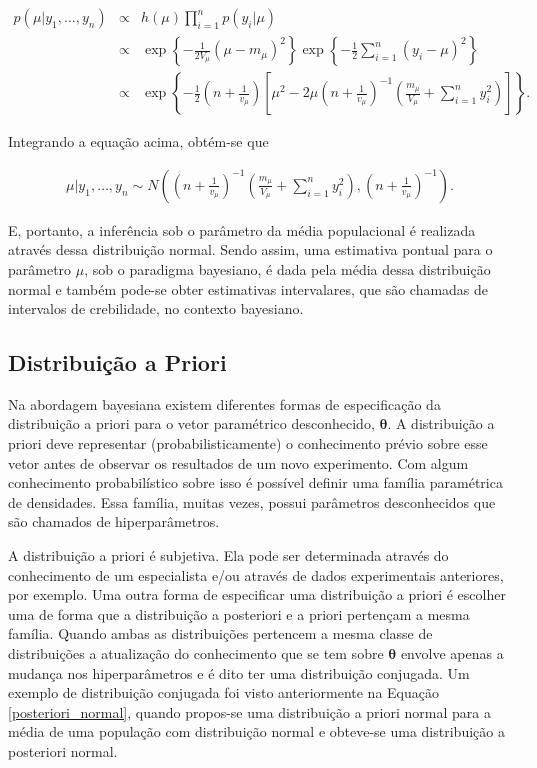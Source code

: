 \documentclass[12pt,a4paper,header]{abnt}
\def\bs{\boldsymbol}
\begin{document}
\begin{eqnarray}
	p(\mu|y_1, \ldots, y_n) &\propto& h(\mu)\prod_{i=1}^n{p(y_i|\mu)}\nonumber \\
	&\propto& \exp\left\{-\frac{1}{2V_\mu}\left(\mu - m_\mu\right)^2\right\} \exp\left\{-\frac{1}{2}\sum_{i=1}^n\left(y_i - \mu\right)^2\right\}\nonumber \\
	&\propto& \exp\left\{-\frac{1}{2} \left( n + \frac{1}{v_\mu} \right) \left[\mu^2 - 2\mu \left( n + \frac{1}{v_\mu} \right)^{-1} \left( \frac{m_\mu}{V_\mu} + \sum_{i=1}^n{y_i^2}\right)\right]   \right\}.
\end{eqnarray}

Integrando a equação acima, obtém-se que

\begin{eqnarray}
\mu|y_1, \ldots, y_n \sim N\left( \left( n + \frac{1}{v_\mu} \right)^{-1} \left( \frac{m_\mu}{V_\mu} + \sum_{i=1}^n{y_i^2}\right), \left( n + \frac{1}{v_\mu} \right)^{-1} \right).\label{posteriori_normal}
\end{eqnarray}


E, portanto, a inferência sob o parâmetro da média populacional é realizada através dessa distribuição normal. Sendo assim, uma estimativa pontual para o parâmetro $\mu$, sob o paradigma bayesiano, é dada pela média dessa distribuição normal e também pode-se obter estimativas intervalares, que são chamadas de intervalos de crebilidade, no contexto bayesiano.

\subsection{Distribuição a Priori}

Na abordagem bayesiana existem diferentes formas de especificação da distribuição a priori para o vetor paramétrico desconhecido, $\bs{\theta}$. A distribuição a priori deve representar (probabilisticamente) o conhecimento prévio sobre esse vetor antes de observar os resultados de um novo experimento. Com algum conhecimento probabilístico sobre isso é possível definir uma família paramétrica de densidades. Essa família, muitas vezes, possui parâmetros desconhecidos que são chamados de hiperparâmetros.

A distribuição a priori é subjetiva. Ela pode ser determinada através do conhecimento de um especialista e/ou através de dados experimentais anteriores, por exemplo. Uma outra forma de especificar uma distribuição a priori é escolher uma de forma que a distribuição a posteriori e a priori pertençam a mesma família. Quando ambas as distribuições pertencem a mesma classe de distribuições a atualização do conhecimento que se tem sobre $\bs{\theta}$ envolve apenas a mudança nos hiperparâmetros e é dito ter uma distribuição conjugada. Um exemplo de distribuição conjugada foi visto anteriormente na Equação \ref{posteriori_normal}, quando propos-se uma distribuição a priori normal para a média de uma população com distribuição normal e obteve-se uma distribuição a posteriori normal.
\end{document}
